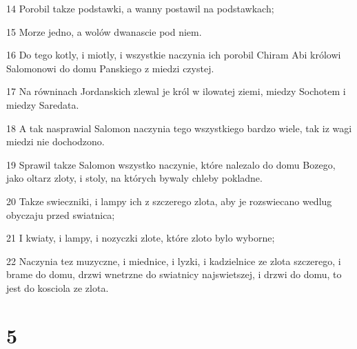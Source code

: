 \par 14 Porobil takze podstawki, a wanny postawil na podstawkach;
\par 15 Morze jedno, a wolów dwanascie pod niem.
\par 16 Do tego kotly, i miotly, i wszystkie naczynia ich porobil Chiram Abi królowi Salomonowi do domu Panskiego z miedzi czystej.
\par 17 Na równinach Jordanskich zlewal je król w ilowatej ziemi, miedzy Sochotem i miedzy Saredata.
\par 18 A tak nasprawial Salomon naczynia tego wszystkiego bardzo wiele, tak iz wagi miedzi nie dochodzono.
\par 19 Sprawil takze Salomon wszystko naczynie, które nalezalo do domu Bozego, jako oltarz zloty, i stoly, na których bywaly chleby pokladne.
\par 20 Takze swieczniki, i lampy ich z szczerego zlota, aby je rozswiecano wedlug obyczaju przed swiatnica;
\par 21 I kwiaty, i lampy, i nozyczki zlote, które zloto bylo wyborne;
\par 22 Naczynia tez muzyczne, i miednice, i lyzki, i kadzielnice ze zlota szczerego, i brame do domu, drzwi wnetrzne do swiatnicy najswietszej, i drzwi do domu, to jest do kosciola ze zlota.

\chapter{5}

